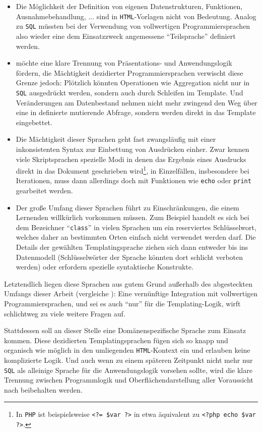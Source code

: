 \begin{itemize}[noitemsep]
\item Die Möglichkeit der Definition von eigenen Datenstrukturen, Funktionen, Ausnahmebehandlung, ... sind in \texttt{HTML}-Vorlagen nicht von Bedeutung. Analog zu \texttt{SQL} müssten bei der Verwendung von vollwertigen Programmiersprachen also wieder eine dem Einsatzzweck angemessene "`Teilsprache"' definiert werden.
\item \idename{} möchte eine klare Trennung von Präsentations- und Anwendungslogik fördern, die Mächtigkeit dezidierter Programmiersprachen verwischt diese Grenze jedoch: Plötzlich könnten Operationen wie Aggregation nicht nur in \texttt{SQL} ausgedrückt werden, sondern auch durch Schleifen im Template. Und Veränderungen am Datenbestand nehmen nicht mehr zwingend den Weg über eine in \idename{} definierte mutierende Abfrage, sondern werden direkt in das Template eingebettet.
\item Die Mächtigkeit dieser Sprachen geht fast zwangsläufig mit einer inkonsistenten Syntax zur Einbettung von Ausdrücken einher. Zwar kennen viele Skriptsprachen spezielle Modi in denen das Ergebnis eines Ausdrucks direkt in das Dokument geschrieben wird\footnote{In \texttt{PHP} ist beispielsweise \texttt{<?= \$var ?>} in etwa äquivalent zu \texttt{<?php echo \$var ?>}.}, in Einzelfällen, insbesondere bei Iterationen, muss dann allerdings doch mit Funktionen wie \texttt{echo} oder \texttt{print} gearbeitet werden.
\item Der große Umfang dieser Sprachen führt zu Einschränkungen, die einem Lernenden willkürlich vorkommen müssen. Zum Beispiel handelt es sich bei dem Bezeichner "`\texttt{class}"' in vielen Sprachen um ein reserviertes Schlüsselwort, welches daher an bestimmten Orten einfach nicht verwendet werden darf. Die Details der gewählten Templatingsprache ziehen sich dann entweder bis ins Datenmodell (Schlüsselwörter der Sprache könnten dort schlicht verboten werden) oder erfordern spezielle syntaktische Konstrukte.
\end{itemize}

Letztendlich liegen diese Sprachen aus gutem Grund außerhalb des abgesteckten Umfangs dieser Arbeit (vergleiche ): Eine vernünftige Integration mit vollwertigen Programmiersprachen, und sei es auch "`nur"' für die Templating-Logik, wirft schlichtweg zu viele weitere Fragen auf.

Stattdessen soll an dieser Stelle eine Domänenspezifische Sprache zum Einsatz kommen. Diese dezidierten Templatingsprachen fügen sich so knapp und organisch wie möglich in den umliegenden \texttt{HTML}-Kontext ein und erlauben keine komplizierte Logik. Und auch wenn \idename{} zu einem späteren Zeitpunkt nicht mehr nur \texttt{SQL} als alleinige Sprache für die Anwendungslogik vorsehen sollte, wird die klare Trennung zwischen Programmlogik und Oberflächendarstellung aller Voraussicht nach beibehalten werden.

